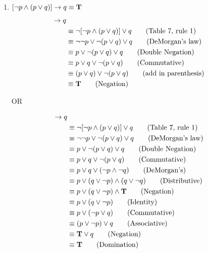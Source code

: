 \begin{questions}
\begin{solution}
\begin{enumerate}[label=(\alph*),itemsep=0pt,parsep=0pt,
topsep=0pt,partopsep=0pt]
    \item $ [ \neg p \wedge (p \vee q) ] \rightarrow q \equiv \mathbf{T}$
    \small
    \begin{align*}
        [ \neg p & \wedge (p \vee q) ] \ra q \\
        & \equiv \neg [ \neg p \wedge (p \vee q) ] \vee q \tag{Table 7, rule 1} \\
        & \equiv \neg \neg p \vee \neg (p \vee q) \vee q \tag{DeMorgan's law} \\
        & \equiv p \vee \neg (p \vee q) \vee q \tag{Double Negation} \\
        & \equiv p \vee q \vee \neg (p \vee q) \tag{Commutative} \\
        & \equiv (p \vee q) \vee \neg (p \vee q) \tag{add in parenthesis}\\
        & \equiv \mathbf{T} \tag{Negation} 
    \end{align*}

    \begin{center}
    OR
    \end{center}

    \vspace{-25pt}
    \begin{align*}
        [ \neg p & \wedge (p \vee q) ] \ra q \\
        & \equiv \neg [ \neg p \wedge (p \vee q) ] \vee q \tag{Table 7, rule 1} \\
        & \equiv \neg \neg p \vee \neg (p \vee q) \vee q \tag{DeMorgan's law} \\
        & \equiv p \vee \neg (p \vee q) \vee q \tag{Double Negation} \\
        & \equiv p \vee q \vee \neg (p \vee q) \tag{Commutative} \\
        & \equiv p \vee q \vee (\neg p \wedge \neg q) \tag{DeMorgan's} \\
        & \equiv p \vee (q \vee \neg p) \wedge (q \vee \neg q) \tag{Distributive} \\
        & \equiv p \vee (q \vee \neg p) \wedge \mathbf{T} \tag{Negation} \\
        & \equiv p \vee (q \vee \neg p) \tag{Identity} \\
        & \equiv p \vee (\neg p \vee q) \tag{Commutative} \\
        & \equiv (p \vee \neg p) \vee q \tag{Associative} \\
        & \equiv \mathbf{T} \vee q \tag{Negation} \\
        & \equiv \mathbf{T} \tag{Domination}
    \end{align*}
    


\end{enumerate}
\end{solution}
\end{questions}
